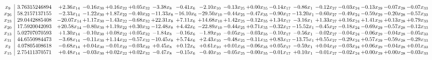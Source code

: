 \documentclass[9pt]{article}
\begin{document}
 \[\begin{array}{c| c c@{\hskip 2pt} c@{\hskip 2pt} c@{\hskip 2pt} c@{\hskip 2pt} c@{\hskip 2pt} c@{\hskip 2pt} c@{\hskip 2pt} c@{\hskip 2pt} c@{\hskip 2pt} c@{\hskip 2pt} c@{\hskip 2pt} c@{\hskip 2pt} c@{\hskip 2pt} c@{\hskip 2pt} c@{\hskip 2pt} c@{\hskip 2pt} }
 x_{9}   &  3.76315246894 & +  2.36 x_{14} & -0.16 x_{30} & +  0.16 x_{22} & +  0.05 x_{32} & -3.38 x_{8} & -0.41 x_{6} & -2.10 x_{10} & -0.13 x_{25} & +  0.00 x_{35} & -0.14 x_{17} & -0.86 x_{1} & -0.12 x_{27} & -0.03 x_{24} & -0.13 x_{29} & -0.07 x_{28} & -0.07 x_{33}\\
 x_{26}   &  58.2157137155 & -2.33 x_{14} & -1.22 x_{30} & +  1.87 x_{22} & -0.40 x_{32} & -11.33 x_{8} & -16.10 x_{6} & -29.50 x_{10} & -0.44 x_{25} & -0.47 x_{35} & -0.90 x_{17} & -13.20 x_{1} & -0.60 x_{27} & -0.49 x_{24} & -0.59 x_{29} & -0.20 x_{28} & -0.57 x_{33}\\
 x_{23}   &  29.0442885408 & -20.07 x_{14} & +  1.17 x_{30} & -1.43 x_{22} & -0.68 x_{32} & + 22.31 x_{8} & +  7.11 x_{6} & + 14.68 x_{10} & +  1.42 x_{25} & -0.12 x_{35} & +  1.34 x_{17} & -3.16 x_{1} & +  1.33 x_{27} & +  0.16 x_{24} & +  1.41 x_{29} & +  0.13 x_{28} & +  0.79 x_{33}\\
 x_{20}   &  17.5920042093 & + 20.58 x_{14} & -0.80 x_{30} & +  1.19 x_{22} & +  0.30 x_{32} & -12.48 x_{8} & +  4.42 x_{6} & -22.89 x_{10} & -0.44 x_{25} & +  0.71 x_{35} & -0.32 x_{17} & -15.52 x_{1} & -0.45 x_{27} & -0.18 x_{24} & -0.69 x_{29} & -0.57 x_{28} & -0.12 x_{33}\\
 x_{13}   &  5.02707070593 & +  1.30 x_{14} & -0.10 x_{30} & +  0.08 x_{22} & +  0.05 x_{32} & -1.84 x_{8} & -0.16 x_{6} & -1.89 x_{10} & -0.05 x_{25} & -0.03 x_{35} & -0.10 x_{17} & -0.56 x_{1} & -0.02 x_{27} & -0.04 x_{24} & -0.06 x_{29} & -0.04 x_{28} & -0.05 x_{33}\\
 x_{31}   &  44.6550984473 & -3.68 x_{14} & -0.11 x_{30} & +  1.14 x_{22} & -0.57 x_{32} & -10.45 x_{8} & +  5.74 x_{6} & +  2.43 x_{10} & -0.48 x_{25} & -0.11 x_{35} & +  0.83 x_{17} & -13.75 x_{1} & +  0.55 x_{27} & -0.29 x_{24} & +  0.57 x_{29} & -0.59 x_{28} & -0.29 x_{33}\\
 x_{2}   &  4.07805408618 & -0.68 x_{14} & +  0.04 x_{30} & -0.01 x_{22} & -0.03 x_{32} & +  0.45 x_{8} & +  0.12 x_{6} & +  0.61 x_{10} & +  0.01 x_{25} & -0.06 x_{35} & +  0.05 x_{17} & -0.59 x_{1} & +  0.04 x_{27} & -0.03 x_{24} & +  0.06 x_{29} & -0.04 x_{28} & +  0.01 x_{33}\\
 x_{15}   &  2.75411370571 & +  0.48 x_{14} & -0.03 x_{30} & +  0.02 x_{22} & +  0.02 x_{32} & -0.47 x_{8} & -0.15 x_{6} & -0.40 x_{10} & -0.05 x_{25} & -0.00 x_{35} & -0.01 x_{17} & +  0.10 x_{1} & -0.01 x_{27} & -0.02 x_{24} & +  0.00 x_{29} & +  0.00 x_{28} & -0.03 x_{33}\\

\end{array}\]
\end{document}

